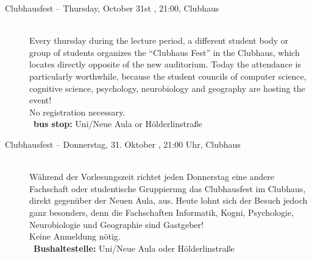 \begin{description}

\ifml
    \item[Clubhausfest -- Thursday, October 31st \YEAR, 21:00, Clubhaus]\ \\
	Every thursday during the lecture period, a different student body or group of students organizes the "`Clubhaus Fest"' in
	the Clubhaus, which locates directly opposite of the new auditorium. Today the attendance is particularly worthwhile, because
	the student councils of computer science, cognitive science, psychology, neurobiology and geography are hosting the event! \\
	No registration necessary.\\
	~\textbf{bus stop:} Uni/Neue Aula or Hölderlinstraße
\else
    \item[Clubhausfest -- Donnerstag, 31. Oktober \YEAR, 21:00 Uhr, Clubhaus]\ \\
	Während der Vorlesungszeit richtet jeden Donnerstag eine andere Fachschaft oder studentische Gruppierung das Clubhausfest
	im Clubhaus, direkt gegenüber der Neuen Aula, aus. Heute lohnt sich der Besuch jedoch ganz besonders, denn die Fachschaften
	Informatik, Kogni, Psychologie, Neurobiologie und Geographie sind Gastgeber! \\
	Keine Anmeldung nötig.\\
	~\textbf{Bushaltestelle:} Uni/Neue Aula oder Hölderlinstraße
\fi


\end{description}
